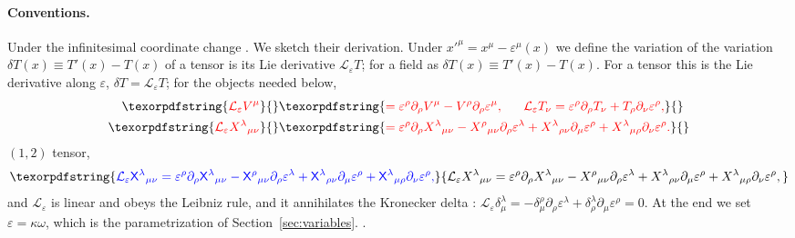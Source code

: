 \documentclass[prd,aps,preprint,superscriptaddress,nofootinbib,amsmath,amssymb,eqsecnum]{revtex4-2}
\providecommand{\DIFaddtex}[1]{{\protect\color{blue} \sf #1}} %
\providecommand{\DIFdeltex}[1]{{\protect\color{red} \scriptsize #1}} %
\providecommand{\DIFaddbegin}{} %
\providecommand{\DIFaddend}{} %
\providecommand{\DIFdelbegin}{} %
\providecommand{\DIFdelend}{} %
\providecommand{\DIFadd}[1]{\texorpdfstring{\DIFaddtex{#1}}{#1}} %
\providecommand{\DIFdel}[1]{\texorpdfstring{\DIFdeltex{#1}}{}} %
\begin{document}
\paragraph{\DIFdel{Conventions.}} %
\addtocounter{paragraph}{-1}%
\DIFdel{Under the infinitesimal coordinate change
}\DIFdelend \DIFaddbegin \DIFadd{. We sketch their derivation. Under }\DIFaddend $x'^\mu=x^\mu-\varepsilon^\mu(x)$ \DIFdelbegin \DIFdel{we define the variation
of }\DIFdelend \DIFaddbegin \DIFadd{the variation
$\delta T(x)\equiv T'(x)-T(x)$ of a tensor is its Lie derivative $\mathcal{L}_\varepsilon T$;
for }\DIFaddend a \DIFdelbegin \DIFdel{field as
$\delta T(x)\equiv T'(x)-T(x)$. For a tensor this is the Lie derivative along $\varepsilon$,
$\delta T=\mathcal{L}_\varepsilon T$;
for the objects needed below,
}\begin{align*}
\DIFdel{\mathcal{L}_\varepsilon V^\mu}&\DIFdel{=\varepsilon^\rho\partial_\rho V^\mu-V^\rho\partial_\rho\varepsilon^\mu,\qquad
\mathcal{L}_\varepsilon T_\nu=\varepsilon^\rho\partial_\rho T_\nu+T_\rho\partial_\nu\varepsilon^\rho,}\\
\DIFdel{\mathcal{L}_\varepsilon X^{\lambda}{}_{\mu\nu}}&\DIFdel{=\varepsilon^\rho\partial_\rho X^{\lambda}{}_{\mu\nu}
-X^{\rho}{}_{\mu\nu}\partial_\rho\varepsilon^\lambda
+X^{\lambda}{}_{\rho\nu}\partial_\mu\varepsilon^\rho
+X^{\lambda}{}_{\mu\rho}\partial_\nu\varepsilon^\rho.
}\end{align*}%
\DIFdelend \DIFaddbegin \DIFadd{$(1,2)$ tensor,
}\begin{equation}
\DIFadd{\mathcal{L}_\varepsilon X^{\lambda}{}_{\mu\nu}=\varepsilon^\rho\partial_\rho X^{\lambda}{}_{\mu\nu}
-X^{\rho}{}_{\mu\nu}\partial_\rho\varepsilon^\lambda
+X^{\lambda}{}_{\rho\nu}\partial_\mu\varepsilon^\rho
+X^{\lambda}{}_{\mu\rho}\partial_\nu\varepsilon^\rho ,
\label{eq:lie12}
}\end{equation}\DIFaddend 
\DIFaddbegin \DIFadd{and }\DIFaddend $\mathcal{L}_\varepsilon$ \DIFdelbegin \DIFdel{is linear and obeys the Leibniz rule, and it }\DIFdelend annihilates the Kronecker delta\DIFdelbegin \DIFdel{: $\mathcal{L}_\varepsilon\delta^\lambda_\mu
=-\delta^{\rho}_{\mu}\partial_\rho\varepsilon^\lambda+\delta^{\lambda}_{\rho}\partial_\mu\varepsilon^\rho=0$.
At the end we set $\varepsilon=\kappa\omega$, which is the parametrization of
Section~\ref{sec:variables}.
}\DIFdelend \DIFaddbegin \DIFadd{.
}\DIFaddend 
\end{document}
